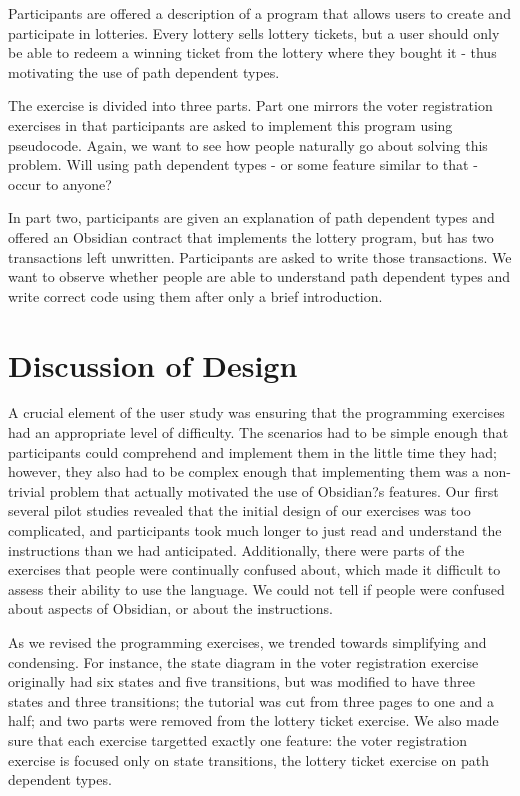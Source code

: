 \documentclass[sigplan,10pt,review,anonymous]{acmart}\settopmatter{printfolios=true}
\begin{document}
Participants are offered a description of a program that allows users to create and participate in lotteries. Every 
lottery sells lottery tickets, but a user should only be able to redeem a winning ticket from the lottery where they 
bought it - thus motivating the use of path dependent types. 

The exercise is divided into three parts. Part one mirrors the voter registration exercises in that participants are 
asked to implement this program using pseudocode. Again, we want to see how people naturally go about 
solving this problem. Will using path dependent types - or some feature similar to that - occur to anyone?
	
In part two, participants are given an explanation of path dependent types and offered an Obsidian contract that 
implements the lottery program, but has two transactions left unwritten. Participants are asked to write 
those transactions. We want to observe whether people are able to understand path dependent types and write 
correct code using them after only a brief introduction. 

\section{Discussion of Design}

A crucial element of the user study was ensuring that the programming exercises had an appropriate level of difficulty. The scenarios had to be simple enough that participants could comprehend and implement them in the little time they had; however, they also had to be complex enough that implementing them was a non-trivial problem that actually motivated the use of Obsidian?s features. Our first several pilot studies revealed that the initial design of our exercises was too complicated, and participants took much longer to just read and understand the instructions than we had anticipated. Additionally, there were parts of the exercises that people were continually confused about, which made it difficult to assess their ability to use the language. We could not tell if people were confused about aspects of Obsidian, or about the instructions. 

As we revised the programming exercises, we trended towards simplifying and condensing. For instance, the state diagram in the voter registration exercise originally had six states and five transitions, but was modified to have three states and three transitions; the tutorial was cut from three pages to one and a half; and two parts were removed from the lottery ticket exercise. We also made sure that each exercise targetted exactly one feature: the voter registration exercise is focused only on state transitions, the lottery ticket exercise on path dependent types. 
\end{document}
